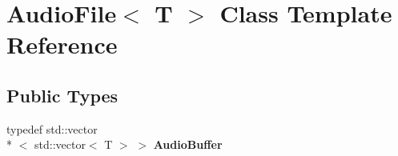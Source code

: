 \hypertarget{class_audio_file}{\section{Audio\-File$<$ T $>$ Class Template Reference}
\label{class_audio_file}
}
\subsection*{Public Types}
\begin{DoxyCompactItemize}
\item 
\hypertarget{class_audio_file_ad1260a47791dc30cbabfe3ff2ea099b1}{typedef std\-::vector\\*
$<$ std\-::vector$<$ T $>$ $>$ {\bfseries Audio\-Buffer}}\label{class_audio_file_ad1260a47791dc30cbabfe3ff2ea099b1}

\end{DoxyCompactItemize}
